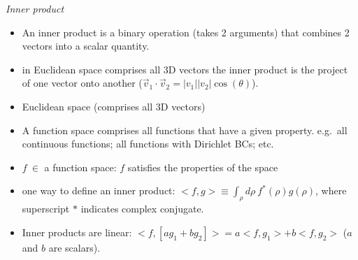\documentclass[12pt]{article}
\begin{document}
\textit{Inner product}
\begin{itemize}
\item An inner product is a binary operation (takes 2 arguments) that combines 2 vectors into a scalar quantity.
\item in Euclidean space comprises all 3D vectors the inner product is the project of one vector onto another ($\vec{v}_1 \cdot \vec{v}_2 = |v_1||v_2|\cos(\theta)$).
\item Euclidean space (comprises all 3D vectors)
\item A function space comprises all functions that have a given property. e.g.\ all continuous functions; all functions with Dirichlet BCs; etc.
\item $f \: \in$ a function space: $f$ satisfies the properties of the space
\item one way to define an inner product: $<f,g> \equiv \int_{\rho} d\rho \: f^{*}(\rho) g(\rho)$, where superscript $*$ indicates complex conjugate.
\item Inner products are linear: $<f, [ag_1 + bg_2]> = a<f, g_1> + b<f, g_2>$ ($a$ and $b$ are scalars).
\end{itemize}
\end{document}

